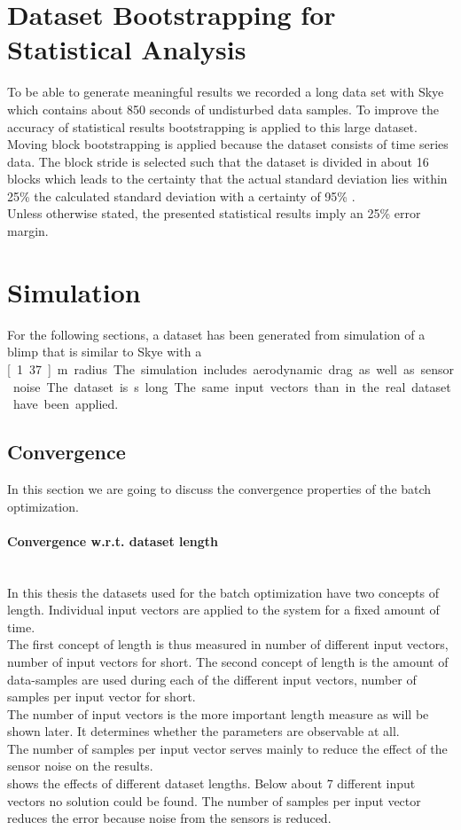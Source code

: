 \section{Dataset Bootstrapping for Statistical Analysis}
\label{sec:bootstrapping_and_statistics}
To be able to generate meaningful results we recorded a long data set with Skye which contains about 850 seconds of undisturbed data samples.
To improve the accuracy of statistical results bootstrapping is applied to this large dataset.
Moving block bootstrapping is applied because the dataset consists of time series data.
The block stride is selected such that the dataset is divided in about 16 blocks which
leads to the certainty that the actual standard deviation lies within 25\% the calculated standard deviation with a certainty of 95\% \citep{WikiMaringOfError}. \\
Unless otherwise stated, the presented statistical results imply an 25\% error margin.

\section{Simulation}
For the following sections, a dataset has been generated from simulation of a blimp that is similar to Skye with a \unit[1.37]{m} radius.
The simulation includes aerodynamic drag as well as sensor noise.
The dataset is \unit[850]{s} long.
The same input vectors than in the real dataset have been applied.

\subsection{Convergence}
\label{sec:sim_convergence}
In this section we are going to discuss the convergence properties of the batch optimization.

\paragraph{Convergence w.r.t. dataset length} ~\\
In this thesis the datasets used for the batch optimization have two concepts of length.
Individual input vectors are applied to the system for a fixed amount of time. \\
The first concept of length is thus measured in number of different input vectors, number of input vectors for short.
The second concept of length is the amount of data-samples are used during each of the different input vectors, number of samples per input vector for short. \\
The number of input vectors is the more important length measure as will be shown later.
It determines whether the parameters are observable at all. \\
The number of samples per input vector serves mainly to reduce the effect of the sensor noise on the results. \\
 shows the effects of different dataset lengths.
Below about 7 different input vectors no solution could be found. 
The number of samples per input vector reduces the error because noise from the sensors is reduced.

